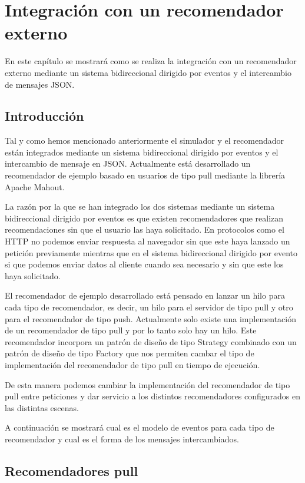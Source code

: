 \chapter{Integración con un recomendador externo}

En este capítulo se mostrará como se realiza la integración con un recomendador externo mediante un sistema bidireccional dirigido por eventos y el intercambio de mensajes JSON.

\section{Introducción}

Tal y como hemos mencionado anteriormente el simulador y el recomendador están integrados mediante un sistema bidireccional dirigido por eventos y el intercambio de mensaje en JSON. Actualmente está desarrollado un recomendador de ejemplo basado en usuarios de tipo pull mediante la librería Apache Mahout. 

La razón por la que se han integrado los dos sistemas mediante un sistema bidireccional dirigido por eventos es que existen recomendadores que realizan recomendaciones sin que el usuario las haya solicitado. En protocolos como el HTTP no podemos enviar respuesta al navegador sin que este haya lanzado un petición previamente mientras que en el sistema bidireccional dirigido por evento si que podemos enviar datos al cliente cuando sea necesario y sin que este los haya solicitado. 

El recomendador de ejemplo desarrollado está pensado en lanzar un hilo para cada tipo de recomendador, es decir, un hilo para el servidor de tipo pull y otro para el recomendador de tipo push. Actualmente solo existe una implementación de un recomendador de tipo pull y por lo tanto solo hay un hilo. Este recomendador incorpora un patrón de diseño de tipo Strategy combinado con un patrón de diseño de tipo Factory que nos permiten cambar el tipo de implementación del recomendador de tipo pull en tiempo de ejecución. 

De esta manera podemos cambiar la implementación del recomendador de tipo pull entre peticiones y dar servicio a los distintos recomendadores configurados en las distintas escenas. 

A continuación se mostrará cual es el modelo de eventos para cada tipo de recomendador y cual es el forma de los mensajes intercambiados. 

\section{Recomendadores pull}


